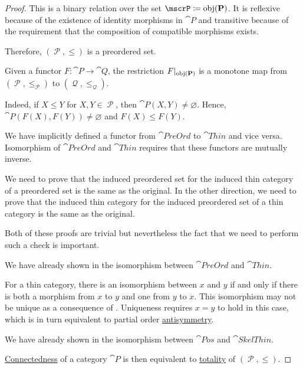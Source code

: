 \begin{proof}
  This is a binary relation over the set \( \mscrP \coloneqq \obj(\cat{P}) \). It is reflexive because of the existence of identity morphisms in \( \cat{P} \) and transitive because of the requirement that the composition of compatible morphisms exists.

  Therefore, \( (\mscrP, \leq) \) is a preordered set.

  Given a functor \( F: \cat{P} \to \cat{Q} \), the restriction \( F\vert_{\operatorname{obj}(\operatorname{\mathbf{P}})} \) is a monotone map from \( (\mscrP, \leq_\mscrP) \) to \( (\mscrQ, \leq_\mscrQ) \).

  Indeed, if \( X \leq Y \) for \( X, Y \in \mscrP \), then \( \cat{P}(X, Y) \neq \varnothing \). Hence, \( \cat{P}(F(X), F(Y)) \neq \varnothing \) and \( F(X) \leq F(Y) \).

   We have implicitly defined a functor from \( \cat{PreOrd} \) to \( \cat{Thin} \) and vice versa. Isomorphism of \( \cat{PreOrd} \) and \( \cat{Thin} \) requires that these functors are mutually inverse.

  We need to prove that the induced preordered set for the induced thin category of a preordered set is the same as the original. In the other direction, we need to prove that the induced thin category for the induced preordered set of a thin category is the same as the original.

  Both of these proofs are trivial but nevertheless the fact that we need to perform such a check is important.

   We have already shown in  the isomorphism between \( \cat{PreOrd} \) and \( \cat{Thin} \).

  For a thin category, there is an isomorphism between \( x \) and \( y \) if and only if there is both a morphism from \( x \) to \( y \) and one from \( y \) to \( x \). This isomorphism may not be unique as a consequence of . Uniqueness requires \( x = y \) to hold in this case, which is in turn equivalent to partial order \hyperref[def:binary_relation/antisymmetric]{antisymmetry}.

   We have already shown in  the isomorphism between \( \cat{Pos} \) and \( \cat{SkelThin} \).

  \hyperref[def:connected_category]{Connectedness} of a category \( \cat{P} \) is then equivalent to \hyperref[def:binary_relation/total]{totality} of \( (\mscrP, \leq) \).
\end{proof}

